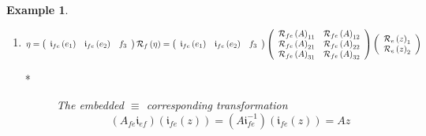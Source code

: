 \documentclass[aps,preprint]{revtex4}%
\newtheorem{example}[theorem]{Example}
\begin{document}
\begin{example}
\begin{enumerate}
\begin{enumerate}
\item
\begin{equation}
\eta=\left(
\begin{array}
[c]{ccc}%
\mathfrak{i}_{fe}\left(  e_{1}\right)  & \mathfrak{i}_{fe}\left(  e_{2}\right)
& f_{3}%
\end{array}
\right)  \mathcal{R}_{f}\left(  \eta\right)  =\left(
\begin{array}
[c]{ccc}%
\mathfrak{i}_{fe}\left(  e_{1}\right)  & \mathfrak{i}_{fe}\left(  e_{2}\right)
& f_{3}%
\end{array}
\right)  \left(
\begin{array}
[c]{cc}%
\mathcal{R}_{fe}\left(  A\right)  _{11} & \mathcal{R}_{fe}\left(  A\right)
_{12}\\
\mathcal{R}_{fe}\left(  A\right)  _{21} & \mathcal{R}_{fe}\left(  A\right)
_{22}\\
\mathcal{R}_{fe}\left(  A\right)  _{31} & \mathcal{R}_{fe}\left(  A\right)
_{32}%
\end{array}
\right)  \left(
\begin{array}
[c]{c}%
\mathcal{R}_{e}\left(  z\right)  _{1}\\
\mathcal{R}_{e}\left(  z\right)  _{2}%
\end{array}
\right)
\end{equation}


\begin{description}
\item[*] The embedded $\equiv$ corresponding transformation%
\begin{equation}
\left(  A_{fe}\mathfrak{i}_{ef}\right)  \left(  \mathfrak{i}_{fe}\left(
z\right)  \right)  =\left(  A\mathfrak{i}_{fe}^{-1}\right)  \left(
\mathfrak{i}_{fe}\left(  z\right)  \right)  =Az
\end{equation}



\end{description}
\end{enumerate}
\end{enumerate}
\end{example}
\end{document}
